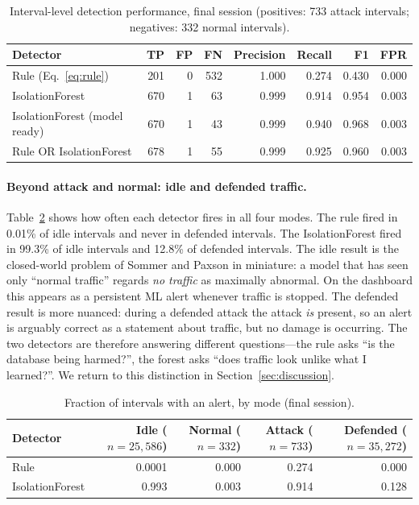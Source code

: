 \documentclass[preprint,12pt]{elsarticle}
\begin{document}
\begin{table}[t]
\centering
\caption{Interval-level detection performance, final session (positives: 733 attack
intervals; negatives: 332 normal intervals).}
\label{tab:tick}
\small
\begin{tabular}{@{}lrrrrrrr@{}}
\toprule
Detector & TP & FP & FN & Precision & Recall & F1 & FPR \\
\midrule
Rule (Eq.~\ref{eq:rule}) & 201 & 0 & 532 & 1.000 & 0.274 & 0.430 & 0.000 \\
IsolationForest & 670 & 1 & 63 & 0.999 & 0.914 & 0.954 & 0.003 \\
IsolationForest (model ready) & 670 & 1 & 43 & 0.999 & 0.940 & 0.968 & 0.003 \\
Rule OR IsolationForest & 678 & 1 & 55 & 0.999 & 0.925 & 0.960 & 0.003 \\
\bottomrule
\end{tabular}
\end{table}

\paragraph{Beyond attack and normal: idle and defended traffic.} Table~\ref{tab:alertrates}
shows how often each detector fires in all four modes. The rule fired in 0.01\% of
idle intervals and never in defended intervals. The IsolationForest fired in 99.3\% of
idle intervals and 12.8\% of defended intervals. The idle result is the closed-world
problem of Sommer and Paxson \cite{sommer2010} in miniature: a model that has seen only
``normal traffic'' regards \emph{no traffic} as maximally abnormal. On the dashboard
this appears as a persistent ML alert whenever traffic is stopped. The defended result
is more nuanced: during a defended attack the attack \emph{is} present, so an alert is
arguably correct as a statement about traffic, but no damage is occurring. The two
detectors are therefore answering different questions---the rule asks ``is the
database being harmed?'', the forest asks ``does traffic look unlike what I learned?''.
We return to this distinction in Section~\ref{sec:discussion}.

\begin{table}[t]
\centering
\caption{Fraction of intervals with an alert, by mode (final session).}
\label{tab:alertrates}
\small
\begin{tabular}{@{}lrrrr@{}}
\toprule
Detector & Idle ($n=25{,}586$) & Normal ($n=332$) & Attack ($n=733$) & Defended ($n=35{,}272$) \\
\midrule
Rule & 0.0001 & 0.000 & 0.274 & 0.000 \\
IsolationForest & 0.993 & 0.003 & 0.914 & 0.128 \\
\bottomrule
\end{tabular}
\end{table}
\end{document}
